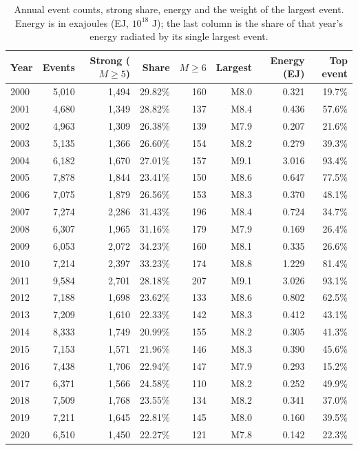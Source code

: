\documentclass[11pt,a4paper]{article}
\begin{document}
\begin{table}[H]\centering\small
\caption{Annual event counts, strong share, energy and the weight of the largest event. Energy is in exajoules (EJ, $10^{18}$ J); the last column is the share of that year's energy radiated by its single largest event.}
\begin{tabular}{lrrrrrrr}\toprule
Year & Events & Strong ($M\ge5$) & Share & $M\ge6$ & Largest & Energy (EJ) & Top event\\\midrule
2000 & 5,010 & 1,494 & 29.82\% & 160 & M8.0 & 0.321 & 19.7\%\\
2001 & 4,680 & 1,349 & 28.82\% & 137 & M8.4 & 0.436 & 57.6\%\\
2002 & 4,963 & 1,309 & 26.38\% & 139 & M7.9 & 0.207 & 21.6\%\\
2003 & 5,135 & 1,366 & 26.60\% & 154 & M8.2 & 0.279 & 39.3\%\\
2004 & 6,182 & 1,670 & 27.01\% & 157 & M9.1 & 3.016 & 93.4\%\\
2005 & 7,878 & 1,844 & 23.41\% & 150 & M8.6 & 0.647 & 77.5\%\\
2006 & 7,075 & 1,879 & 26.56\% & 153 & M8.3 & 0.370 & 48.1\%\\
2007 & 7,274 & 2,286 & 31.43\% & 196 & M8.4 & 0.724 & 34.7\%\\
2008 & 6,307 & 1,965 & 31.16\% & 179 & M7.9 & 0.169 & 26.4\%\\
2009 & 6,053 & 2,072 & 34.23\% & 160 & M8.1 & 0.335 & 26.6\%\\
2010 & 7,214 & 2,397 & 33.23\% & 174 & M8.8 & 1.229 & 81.4\%\\
2011 & 9,584 & 2,701 & 28.18\% & 207 & M9.1 & 3.026 & 93.1\%\\
2012 & 7,188 & 1,698 & 23.62\% & 133 & M8.6 & 0.802 & 62.5\%\\
2013 & 7,209 & 1,610 & 22.33\% & 142 & M8.3 & 0.412 & 43.1\%\\
2014 & 8,333 & 1,749 & 20.99\% & 155 & M8.2 & 0.305 & 41.3\%\\
2015 & 7,153 & 1,571 & 21.96\% & 146 & M8.3 & 0.390 & 45.6\%\\
2016 & 7,438 & 1,706 & 22.94\% & 147 & M7.9 & 0.293 & 15.2\%\\
2017 & 6,371 & 1,566 & 24.58\% & 110 & M8.2 & 0.252 & 49.9\%\\
2018 & 7,509 & 1,768 & 23.55\% & 134 & M8.2 & 0.341 & 37.0\%\\
2019 & 7,211 & 1,645 & 22.81\% & 145 & M8.0 & 0.160 & 39.5\%\\
2020 & 6,510 & 1,450 & 22.27\% & 121 & M7.8 & 0.142 & 22.3\%\\

\end{tabular}
\end{table}
\end{document}

